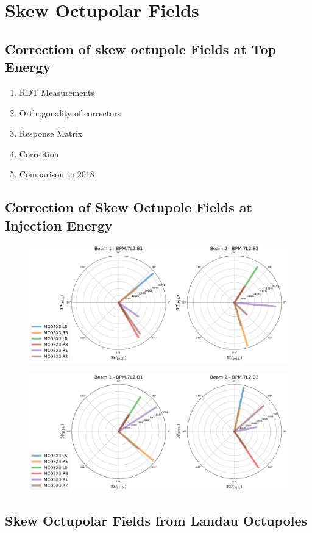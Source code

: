 \chapter{Skew Octupolar Fields}
\label{chapter:skew_octupole_fields}
\thumbforchapter{}
\chaptertoc{}
\newpage

\section{Correction of skew octupole Fields at Top Energy}

\begin{enumerate}
    \color{red}
    \item RDT Measurements
    \item Orthogonality of correctors
    \item Response Matrix
    \item Correction
    \item Comparison to 2018
\end{enumerate}


\section{Correction of Skew Octupole Fields at Injection Energy}

\begin{figure}[H]
    \includegraphics[width=\textwidth]{./chapters/07_octupoles/images/f1012_y_injection.pdf}
    \caption{}
    \label{fig:a4_injection_orthogonal_f1012}
\end{figure}

\begin{figure}[H]
    \includegraphics[width=\textwidth]{chapters/07_octupoles/images/f1210_x_injection.pdf}
    \caption{}
    \label{fig:a4_injection_orthogonal_f1210}
\end{figure}





\section{Skew Octupolar Fields from Landau Octupoles}